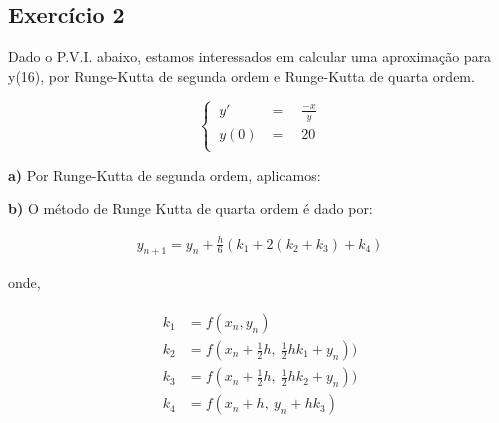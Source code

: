 \documentclass[paper=a4, fontsize=12pt]{scrartcl}
\numberwithin{equation}{section} %
\numberwithin{figure}{section} %
\numberwithin{table}{section} %
\begin{document}
		\subsection{Exercício 2}

		Dado o P.V.I. abaixo, estamos interessados em calcular uma aproximação para y(16), por Runge-Kutta de segunda ordem e Runge-Kutta de quarta ordem.

		\[
		\begin{cases}
		\ y' &= \quad \frac{-x}{y}\\

		\ y(0) &= \quad 20\\
		\end{cases}
		\]

		\textbf{a)} Por Runge-Kutta de segunda ordem, aplicamos:

		\hspace{2cm}

		

		\hspace{2cm}


		

		\hspace{2cm}


		\textbf{b)} O método de Runge Kutta de quarta ordem é dado por:

		\begin{align*}
			y_{n + 1} = y_n + \frac{h}{6}(k_1 + 2(k_2 + k_3) + k_4)
		\end{align*}

		onde,

		\begin{align*}
			\begin{split}
				k_1 &= f(x_n, y_n) \\
				k_2 &= f(x_n + \frac{1}{2}h,\ \frac{1}{2}hk_1 + y_n))\\
				k_3 &= f(x_n + \frac{1}{2}h,\ \frac{1}{2}hk_2 + y_n))\\
				k_4 &= f(x_n + h,\ y_n + hk_3) \\
			\end{split}
		\end{align*}
\end{document}
